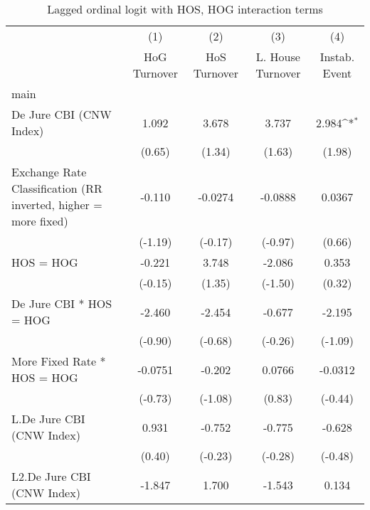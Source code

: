 {
\def\sym#1{\ifmmode^{#1}\else\(^{#1}\)\fi}
\begin{longtable}{l*{4}{c}}
\caption{Lagged ordinal logit with HOS, HOG interaction terms \label{hoshogintlagordLogLogDJ}}\\
\hline\hline\endfirsthead\hline\endhead\hline\endfoot\endlastfoot
                &\multicolumn{1}{c}{(1)}&\multicolumn{1}{c}{(2)}&\multicolumn{1}{c}{(3)}&\multicolumn{1}{c}{(4)}\\
                &\multicolumn{1}{c}{HoG Turnover}&\multicolumn{1}{c}{HoS Turnover}&\multicolumn{1}{c}{L. House Turnover}&\multicolumn{1}{c}{Instab. Event}\\
\hline
main            &                  &                  &                  &                  \\
De Jure CBI (CNW Index)&    1.092         &    3.678         &    3.737         &    2.984\sym{*}  \\
                &   (0.65)         &   (1.34)         &   (1.63)         &   (1.98)         \\
[1em]
Exchange Rate Classification (RR inverted, higher = more fixed)&   -0.110         &  -0.0274         &  -0.0888         &   0.0367         \\
                &  (-1.19)         &  (-0.17)         &  (-0.97)         &   (0.66)         \\
[1em]
HOS = HOG       &   -0.221         &    3.748         &   -2.086         &    0.353         \\
                &  (-0.15)         &   (1.35)         &  (-1.50)         &   (0.32)         \\
[1em]
De Jure CBI * HOS = HOG&   -2.460         &   -2.454         &   -0.677         &   -2.195         \\
                &  (-0.90)         &  (-0.68)         &  (-0.26)         &  (-1.09)         \\
[1em]
More Fixed Rate * HOS = HOG&  -0.0751         &   -0.202         &   0.0766         &  -0.0312         \\
                &  (-0.73)         &  (-1.08)         &   (0.83)         &  (-0.44)         \\
[1em]
L.De Jure CBI (CNW Index)&    0.931         &   -0.752         &   -0.775         &   -0.628         \\
                &   (0.40)         &  (-0.23)         &  (-0.28)         &  (-0.48)         \\
[1em]
L2.De Jure CBI (CNW Index)&   -1.847         &    1.700         &   -1.543         &    0.134         \\

\end{longtable}}
